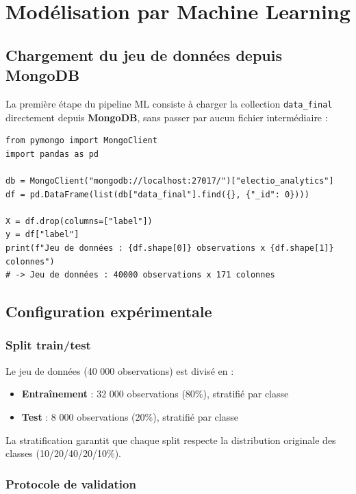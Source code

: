 \chapter{Modélisation par Machine Learning}
\label{ch:ml}

\section{Chargement du jeu de données depuis MongoDB}

La première étape du pipeline ML consiste à charger la collection \texttt{data\_final}
directement depuis \textbf{MongoDB}, sans passer par aucun fichier intermédiaire :

\begin{verbatim}
from pymongo import MongoClient
import pandas as pd

db = MongoClient("mongodb://localhost:27017/")["electio_analytics"]
df = pd.DataFrame(list(db["data_final"].find({}, {"_id": 0})))

X = df.drop(columns=["label"])
y = df["label"]
print(f"Jeu de données : {df.shape[0]} observations x {df.shape[1]} colonnes")
# -> Jeu de données : 40000 observations x 171 colonnes
\end{verbatim}

\section{Configuration expérimentale}

\subsection{Split train/test}

Le jeu de données (40 000 observations) est divisé en :
\begin{itemize}
  \item \textbf{Entraînement} : 32 000 observations (80\%), stratifié par classe
  \item \textbf{Test} : 8 000 observations (20\%), stratifié par classe
\end{itemize}

La stratification garantit que chaque split respecte la distribution originale des
classes (10/20/40/20/10\%).

\subsection{Protocole de validation}


